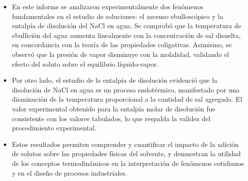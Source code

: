 \documentclass{article}
\begin{document}
\begin{itemize}
    \item En este informe se analizaron experimentalmente dos fenómenos fundamentales en el estudio de soluciones: el ascenso ebulloscópico y la entalpía de disolución del NaCl en agua. Se comprobó que la temperatura de ebullición del agua aumenta linealmente con la concentración de sal disuelta, en concordancia con la teoría de las propiedades coligativas. Asimismo, se observó que la presión de vapor disminuye con la molalidad, validando el efecto del soluto sobre el equilibrio líquido-vapor.

    \item Por otro lado, el estudio de la entalpía de disolución evidenció que la disolución de NaCl en agua es un proceso endotérmico, manifestado por una disminución de la temperatura proporcional a la cantidad de sal agregada. El valor experimental obtenido para la entalpía molar de disolución fue consistente con los valores tabulados, lo que respalda la validez del procedimiento experimental.

    \item Estos resultados permiten comprender y cuantificar el impacto de la adición de solutos sobre las propiedades físicas del solvente, y demuestran la utilidad de los conceptos termodinámicos en la interpretación de fenómenos cotidianos y en el diseño de procesos industriales.
\end{itemize}

\renewcommand{\refname}{Bibliografía}
\printbibliography
\end{document}
